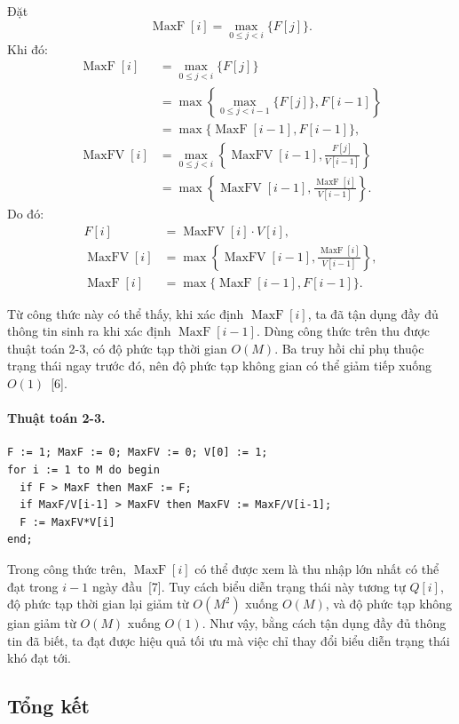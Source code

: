 \documentclass[11pt]{article}
\begin{document}
Đặt
\[
  \operatorname{MaxF}[i]=\max_{0\le j<i}\{F[j]\}.
\]
Khi đó:
\[
\begin{aligned}
\operatorname{MaxF}[i]
&= \max_{0\le j<i}\{F[j]\}\\
&= \max\left\{\max_{0\le j<i-1}\{F[j]\}, F[i-1]\right\}\\
&= \max\{\operatorname{MaxF}[i-1],F[i-1]\},\\
\operatorname{MaxFV}[i]
&= \max_{0\le j<i}\left\{\operatorname{MaxFV}[i-1],
  \frac{F[j]}{V[i-1]}\right\}\\
&= \max\left\{\operatorname{MaxFV}[i-1],
  \frac{\operatorname{MaxF}[i]}{V[i-1]}\right\}.
\end{aligned}
\]
Do đó:
\[
\begin{aligned}
F[i] &= \operatorname{MaxFV}[i]\cdot V[i],\\
\operatorname{MaxFV}[i] &=
  \max\left\{\operatorname{MaxFV}[i-1],
  \frac{\operatorname{MaxF}[i]}{V[i-1]}\right\},\\
\operatorname{MaxF}[i] &= \max\{\operatorname{MaxF}[i-1],F[i-1]\}.
\end{aligned}
\]

Từ công thức này có thể thấy, khi xác định \(\operatorname{MaxF}[i]\), ta đã
tận dụng đầy đủ thông tin sinh ra khi xác định \(\operatorname{MaxF}[i-1]\).
Dùng công thức trên thu được thuật toán 2-3, có độ phức tạp thời gian \(O(M)\).
Ba truy hồi chỉ phụ thuộc trạng thái ngay trước đó, nên độ phức tạp không
gian có thể giảm tiếp xuống \(O(1)\)~[6].

\paragraph{Thuật toán 2-3.}
\begin{verbatim}
F := 1; MaxF := 0; MaxFV := 0; V[0] := 1;
for i := 1 to M do begin
  if F > MaxF then MaxF := F;
  if MaxF/V[i-1] > MaxFV then MaxFV := MaxF/V[i-1];
  F := MaxFV*V[i]
end;
\end{verbatim}

Trong công thức trên, \(\operatorname{MaxF}[i]\) có thể được xem là thu nhập
lớn nhất có thể đạt trong \(i-1\) ngày đầu~[7]. Tuy cách biểu diễn trạng thái
này tương tự \(Q[i]\), độ phức tạp thời gian lại giảm từ \(O(M^2)\) xuống
\(O(M)\), và độ phức tạp không gian giảm từ \(O(M)\) xuống \(O(1)\). Như vậy,
bằng cách tận dụng đầy đủ thông tin đã biết, ta đạt được hiệu quả tối ưu mà
việc chỉ thay đổi biểu diễn trạng thái khó đạt tới.

\subsection{Tổng kết}
\end{document}
